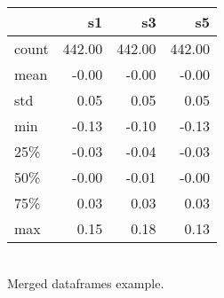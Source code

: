 \begin{tabular}{lrrr}
\toprule
{} &     s1 &     s3 &     s5 \\
\midrule
count & 442.00 & 442.00 & 442.00 \\
mean  &  -0.00 &  -0.00 &  -0.00 \\
std   &   0.05 &   0.05 &   0.05 \\
min   &  -0.13 &  -0.10 &  -0.13 \\
25\%   &  -0.03 &  -0.04 &  -0.03 \\
50\%   &  -0.00 &  -0.01 &  -0.00 \\
75\%   &   0.03 &   0.03 &   0.03 \\
max   &   0.15 &   0.18 &   0.13 \\
\bottomrule
\end{tabular}
\\\caption{Merged dataframes example.}